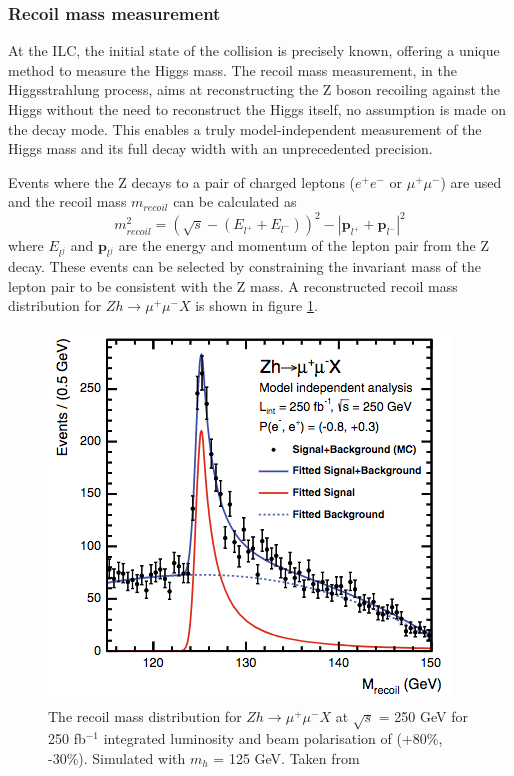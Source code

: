 \subsubsection{Recoil mass measurement}

At the ILC, the initial state of the collision is precisely known, offering a unique method to measure the Higgs mass. The recoil mass measurement, in the Higgsstrahlung process, aims at reconstructing the Z boson recoiling against the Higgs without the need to reconstruct the Higgs itself, no assumption is made on the decay mode. This enables a truly model-independent measurement of the Higgs mass and its full decay width with an unprecedented precision.

Events where the Z decays to a pair of charged leptons ($e^+e^-$ or $\mu^+ \mu^-$) are used and the recoil mass $m_{recoil}$ can be calculated as \cite{Yan:2016xyx}
\begin{equation}
  m_{recoil}^2 = (\sqrt{s} - (E_{l^+} + E_{l^-}))^2 -  |\textbf{p}_{l^+} + \textbf{p}_{l^-}|^2
\end{equation}
where $E_{l^j}$ and $\textbf{p}_{l^j}$ are the energy and momentum of the lepton pair from the Z decay. These events can be selected by constraining the invariant mass of the lepton pair to be consistent with the Z mass. A reconstructed recoil mass distribution for $Zh \rightarrow \mu^+\mu^-X$ is shown in figure \ref{fig:HiggsRecoilMuMu}.

\begin{figure}[htbp!]
  \centering
  \includegraphics[width=0.5\linewidth]{chap2/fig/HiggsRecoilMuMu.png}
  \caption{The recoil mass distribution for $Zh \rightarrow \mu^+\mu^-X$ at $\sqrt{s}$ = 250 GeV for 250 fb$^{-1}$ integrated luminosity and beam polarisation of (+80\%, -30\%). Simulated with $m_h$ = 125 GeV. Taken from \cite{Thomson2016}} \label{fig:HiggsRecoilMuMu}
\end{figure}


